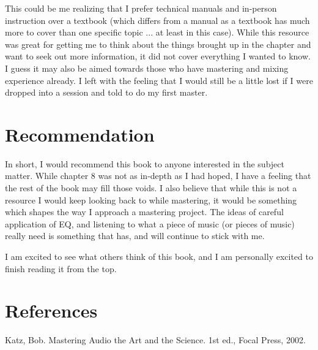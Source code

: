 \documentclass{article}
\begin{document}
\medskip

This could be me realizing that I prefer technical manuals and in-person instruction over a textbook (which differs from a manual as a textbook has much more to cover than one specific topic ... at least in this case). While this resource was great for getting me to think about the things brought up in the chapter and want to seek out more information, it did not cover everything I wanted to know. I guess it may also be aimed towards those who have mastering and mixing experience already. I left with the feeling that I would still be a little lost if I were dropped into a session and told to do my first master.

\section{Recommendation}

In short, I would recommend this book to anyone interested in the subject matter. While chapter 8 was not as in-depth as I had hoped, I have a feeling that the rest of the book may fill those voids. I also believe that while this is not a resource I would keep looking back to while mastering, it would be something which shapes the way I approach a mastering project. The ideas of careful application of EQ, and listening to what a piece of music (or pieces of music) really need is something that has, and will continue to stick with me.

\medskip

I am excited to see what others think of this book, and I am personally excited to finish reading it from the top.

\section{References}

Katz, Bob. Mastering Audio the Art and the Science. 1st ed., Focal Press, 2002. 
\end{document}
